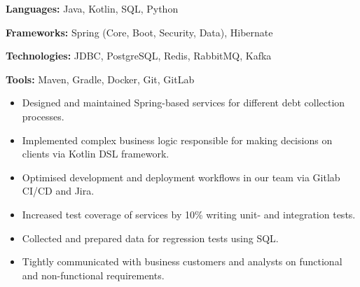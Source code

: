\documentclass[12pt,a4paper,ragged2e,withhyper]{altacv}
\begin{document}

\medskip


\personalinfo{
  \location{Tallinn, Estonia}
  \email{adp3171@gmail.com}
  \linkedin{no-reason-why-not}
  \github{github.com/leeeqo}
} 

\makecvheader

\medskip

\textbf{Languages:} Java, Kotlin, SQL, Python
\smallskip

\textbf{Frameworks:} Spring (Core, Boot, Security, Data), Hibernate
\smallskip

\textbf{Technologies:} JDBC, PostgreSQL, Redis, RabbitMQ, Kafka
\smallskip 

\textbf{Tools:} Maven, Gradle, Docker, Git, GitLab

\medskip


\begin{itemize}
    \item Designed and maintained Spring-based services for different debt collection processes.
    \item Implemented complex business logic responsible for making decisions on clients via Kotlin DSL framework.
    \item Optimised development and deployment workflows in our team via Gitlab CI/CD and Jira.
    \item Increased test coverage of services by 10\% writing unit- and integration tests.
    \item Collected and prepared data for regression tests using SQL.
    \item Tightly communicated with business customers and analysts on functional and non-functional requirements.
\end{itemize}
\end{document}
